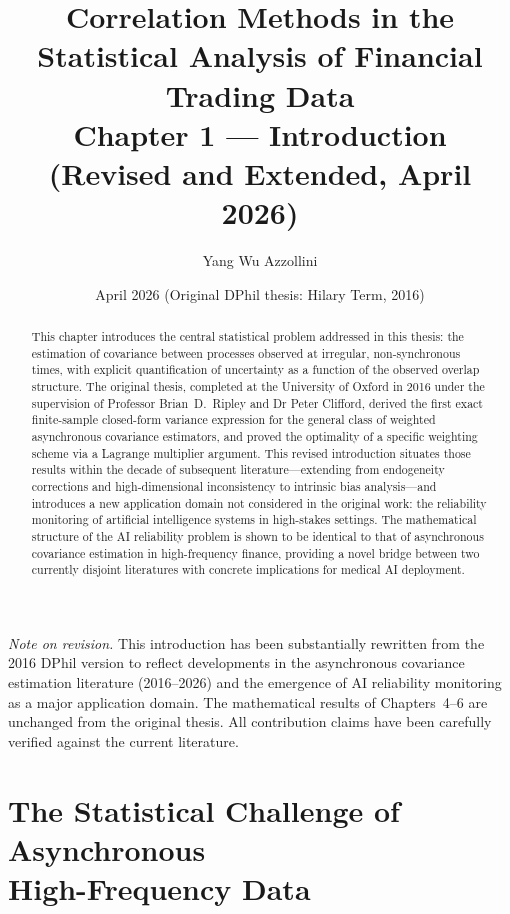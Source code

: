 \documentclass[reqno, 12pt]{amsart}
\title[Asynchronous Covariance Estimation and AI Reliability]{%
  Correlation Methods in the Statistical Analysis of Financial Trading Data\\[0.3em]
  \normalsize Chapter 1 --- Introduction (Revised and Extended, April 2026)}
\author{Yang Wu Azzollini}
\date{April 2026 \quad (Original DPhil thesis: Hilary Term, 2016)}
\theoremstyle{plain}
\theoremstyle{definition}
\theoremstyle{remark}
\begin{document}
\begin{abstract}
This chapter introduces the central statistical problem addressed in
this thesis: the estimation of covariance between processes observed
at irregular, non-synchronous times, with explicit quantification of
uncertainty as a function of the observed overlap structure. The
original thesis, completed at the University of Oxford in 2016 under
the supervision of Professor Brian~D.\ Ripley and Dr Peter Clifford,
derived the first exact finite-sample closed-form variance expression
for the general class of weighted asynchronous covariance estimators,
and proved the optimality of a specific weighting scheme via a Lagrange
multiplier argument. This revised introduction situates those results
within the decade of subsequent literature---extending from
endogeneity corrections and high-dimensional inconsistency to intrinsic
bias analysis---and introduces a new application domain not considered
in the original work: the reliability monitoring of artificial
intelligence systems in high-stakes settings. The mathematical
structure of the AI reliability problem is shown to be identical to
that of asynchronous covariance estimation in high-frequency finance,
providing a novel bridge between two currently disjoint literatures
with concrete implications for medical AI deployment.
\end{abstract}

\maketitle
\linenumbers

\tableofcontents

\bigskip\noindent\textit{Note on revision.}
This introduction has been substantially rewritten from the 2016 DPhil
version to reflect developments in the asynchronous covariance
estimation literature (2016--2026) and the emergence of AI reliability
monitoring as a major application domain. The mathematical results of
Chapters~4--6 are unchanged from the original thesis. All contribution
claims have been carefully verified against the current literature.

\section{The Statistical Challenge of Asynchronous\\
High-Frequency Data}
\label{sec:challenge}
\end{document}
